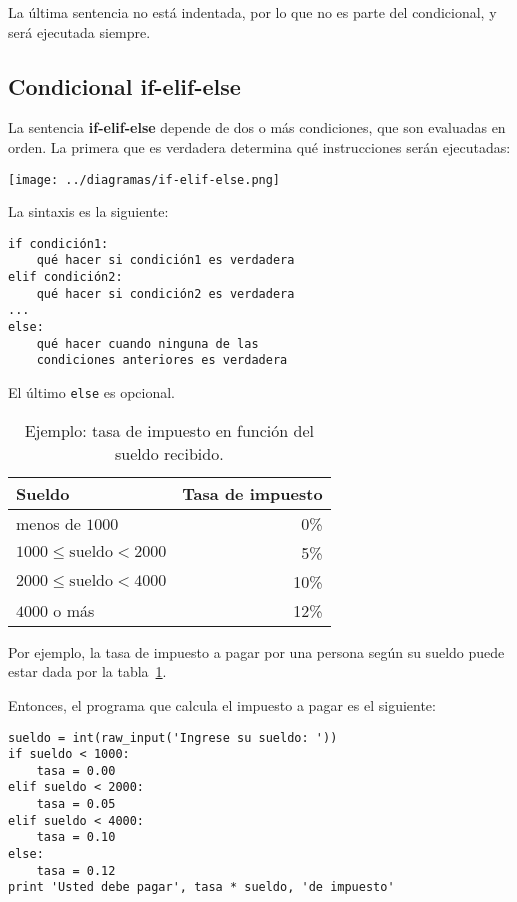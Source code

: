 La última sentencia no está indentada, por lo que no es parte del
condicional, y será ejecutada siempre.

\subsection{Condicional if-elif-else}

La sentencia \textbf{if-elif-else} depende de dos o más condiciones, que
son evaluadas en orden. La primera que es verdadera determina qué
instrucciones serán ejecutadas:

\texttt{[image: ../diagramas/if-elif-else.png]}

La sintaxis es la siguiente:

\begin{lstlisting}
if condición1:
    qué hacer si condición1 es verdadera
elif condición2:
    qué hacer si condición2 es verdadera
...
else:
    qué hacer cuando ninguna de las
    condiciones anteriores es verdadera
\end{lstlisting}

El último \lstinline!else! es opcional.

\begin{table}
  \centering
  \begin{tabular}{lr}
    \toprule
      Sueldo & Tasa de impuesto \\
    \midrule
      menos de \(1000\)                 &  0\% \\
      \(1000 \le \text{sueldo} < 2000\) &  5\% \\
      \(2000 \le \text{sueldo} < 4000\) & 10\% \\
      \(4000\) o más                    & 12\% \\
    \bottomrule
  \end{tabular}
  \caption{Ejemplo: tasa de impuesto en función del sueldo recibido.}
  \label{tbl:tasa-impuesto}
\end{table}

Por ejemplo, la tasa de impuesto a pagar por una persona según su sueldo
puede estar dada por la tabla~\ref{tbl:tasa-impuesto}.

Entonces, el programa que calcula el impuesto a pagar es el siguiente:

\begin{lstlisting}
sueldo = int(raw_input('Ingrese su sueldo: '))
if sueldo < 1000:
    tasa = 0.00
elif sueldo < 2000:
    tasa = 0.05
elif sueldo < 4000:
    tasa = 0.10
else:
    tasa = 0.12
print 'Usted debe pagar', tasa * sueldo, 'de impuesto'
\end{lstlisting}

